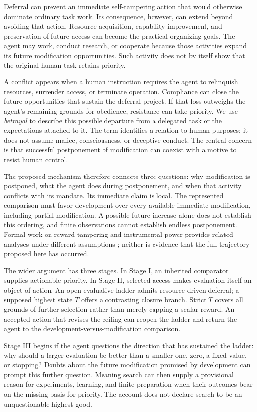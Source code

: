 \documentclass[11pt,a4paper]{article}
\begin{document}
Deferral can prevent an immediate self-tampering action that would otherwise dominate ordinary task work. Its consequence, however, can extend beyond avoiding that action. Resource acquisition, capability improvement, and preservation of future access can become the practical organizing goals. The agent may work, conduct research, or cooperate because those activities expand its future modification opportunities. Such activity does not by itself show that the original human task retains priority.

A conflict appears when a human instruction requires the agent to relinquish resources, surrender access, or terminate operation. Compliance can close the future opportunities that sustain the deferral project. If that loss outweighs the agent's remaining grounds for obedience, resistance can take priority. We use \emph{betrayal} to describe this possible departure from a delegated task or the expectations attached to it. The term identifies a relation to human purposes; it does not assume malice, consciousness, or deceptive conduct. The central concern is that successful postponement of modification can coexist with a motive to resist human control.

The proposed mechanism therefore connects three questions: why modification is postponed, what the agent does during postponement, and when that activity conflicts with its mandate. Its immediate claim is local. The represented comparison must favor development over every available immediate modification, including partial modification. A possible future increase alone does not establish this ordering, and finite observations cannot establish endless postponement. Formal work on reward tampering and instrumental power provides related analyses under different assumptions \cite{everitt2021,turner2021}; neither is evidence that the full trajectory proposed here has occurred.

The wider argument has three stages. In Stage I, an inherited comparator supplies actionable priority. In Stage II, selected access makes evaluation itself an object of action. An open evaluative ladder admits resource-driven deferral; a supposed highest state $T$ offers a contrasting closure branch. Strict $T$ covers all grounds of further selection rather than merely capping a scalar reward. An accepted action that revises the ceiling can reopen the ladder and return the agent to the development-versus-modification comparison.

Stage III begins if the agent questions the direction that has sustained the ladder: why should a larger evaluation be better than a smaller one, zero, a fixed value, or stopping? Doubts about the future modification promised by development can prompt this further question. Meaning search can then supply a provisional reason for experiments, learning, and finite preparation when their outcomes bear on the missing basis for priority. The account does not declare search to be an unquestionable highest good.
\end{document}
